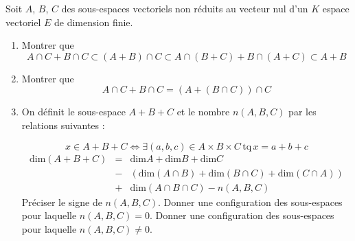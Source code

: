 Soit $A$, $B$, $C$ des sous-espaces vectoriels non r{\'e}duits au
vecteur nul d'un $K$ espace vectoriel $E$ de dimension finie.
\begin{enumerate}
  \item Montrer que
  \[A \cap C + B \cap C \subset (A+B) \cap C \subset A \cap (B+C) + B \cap (A+C) \subset A+B\]
  \item Montrer que
  \[A \cap C + B \cap C = (A + (B \cap C)) \cap C\]
  \item On d{\'e}finit le sous-espace $A+B+C$ et le nombre $n(A,B,C)$
  par les relations suivantes :

  \[x \in A+B+C \Leftrightarrow \exists (a,b,c) \in A\times B \times
  C \, \mathrm{tq} \, x=a+b+c \]
  \begin{eqnarray*}
  \mathrm{dim}(A+B+C) &=& \mathrm{dim} A + \mathrm{dim} B +
  \mathrm{dim}C \\& -&(\mathrm{dim} (A\cap B) + \mathrm{dim} (B\cap C) + \mathrm{dim}(C \cap
  A))\\ &+& \mathrm{dim} (A\cap B \cap C) -n(A,B,C)
  \end{eqnarray*}
  Pr{\'e}ciser le signe de $n(A,B,C)$. Donner une configuration des
  sous-espaces pour laquelle $n(A,B,C)=0$. Donner une configuration des
  sous-espaces pour laquelle $n(A,B,C)\not=0$.
\end{enumerate}

